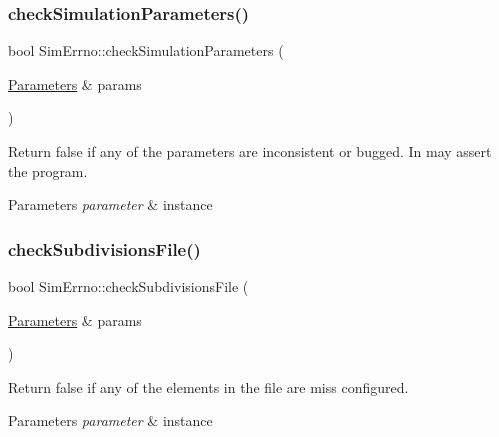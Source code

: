 \subsubsection{\texorpdfstring{check\+Simulation\+Parameters()}{checkSimulationParameters()}}
{\footnotesize\ttfamily bool Sim\+Errno\+::check\+Simulation\+Parameters (\begin{DoxyParamCaption}\item[{\hyperlink{class_parameters}{Parameters} \&}]{params }\end{DoxyParamCaption})\hspace{0.3cm}{\ttfamily [static]}}



Return false if any of the parameters are inconsistent or bugged. In may assert the program. 


\begin{DoxyParams}{Parameters}
{\em parameter} & instance \\
\hline
\end{DoxyParams}
\mbox{\label{class_sim_errno_a71e44ab51c81191171464b1371887844}} 
\subsubsection{\texorpdfstring{check\+Subdivisions\+File()}{checkSubdivisionsFile()}}
{\footnotesize\ttfamily bool Sim\+Errno\+::check\+Subdivisions\+File (\begin{DoxyParamCaption}\item[{\hyperlink{class_parameters}{Parameters} \&}]{params }\end{DoxyParamCaption})\hspace{0.3cm}{\ttfamily [static]}}



Return false if any of the elements in the file are miss configured. 


\begin{DoxyParams}{Parameters}
{\em parameter} & instance \\
\hline
\end{DoxyParams}
\mbox{\label{class_sim_errno_a9b9712b12322cdd0667d6fc4ee7aceaf}} 
